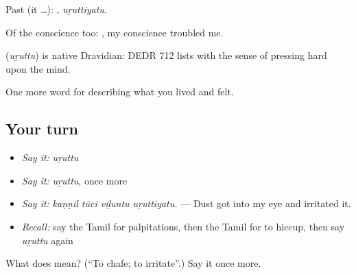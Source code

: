 Past (it …): , \emph{uṟuttiyatu}.

Of the conscience too:  , my conscience troubled me.

\begin{cousinweb}
\textbf{} (\emph{uṟuttu}) is native Dravidian: DEDR 712 lists  with the sense of pressing hard upon the mind.
\end{cousinweb}

\begin{grammarlens}[title={What you've built}]
One more word for describing what you lived and felt.
\end{grammarlens}

\subsection*{Your turn}
\begin{itemize}
\raggedright
  \item \emph{Say it:} \emph{uṟuttu}
  \item \emph{Say it:} \emph{uṟuttu}, once more
  \item \emph{Say it:} \emph{kaṇṇil tūci viḻuntu uṟuttiyatu.} — Dust got into my eye and irritated it.
  \item \emph{Recall:} say the Tamil for palpitations, then the Tamil for to hiccup, then say \emph{uṟuttu} again
\end{itemize}

\begin{tcolorbox}[breakable,colback=teal!4,colframe=teal!35!black,title={Before you move on}]
What does  mean? (\textquotedblleft{}To chafe; to irritate\textquotedblright{}.) Say it once more.
\end{tcolorbox}

